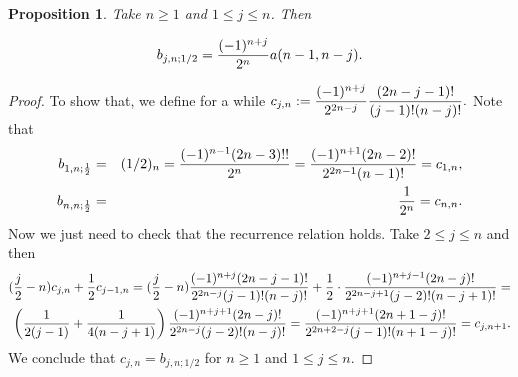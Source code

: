 \documentclass[a4paper,12pt]{amsart}
\newtheorem{proposition}[thm]{Proposition}
\theoremstyle{definition}
\theoremstyle{remark}
\begin{document}
\begin{proposition}\label{parti} Take  $n\ge 1$ and $1\le j\le n$. Then

$$
b_{j,n;1/2}={(-1)^{n+j}\over2^{n}}a(n-1,n-j).
$$

\end{proposition}
\begin{proof}

To show that, we define for a while $ \displaystyle{c_{j,n}:={(-1)^{n+j}\over2^{2n-j}}{(2n-j-1)!\over (j-1)!(n-j)!}.}$ Note that
\begin{eqnarray*}
b_{1,n;\frac{1}{2}}&=&(1/2)_n=\frac{(-1)^{n-1}(2n-3)!!}{2^n}=\frac{(-1)^{n+1}(2n-2)!}{2^{2n-1}(n-1)!}=c_{1,n},\cr
b_{n,n;\frac{1}{2}}&=&\frac{1}{2^n}=c_{n,n}.\end{eqnarray*}
Now we just need to check that the recurrence relation holds. Take $2\le j\le n$ and then
\begin{align*}
({j\over 2} -n)c_{j,n}+{1\over 2}c_{j-1,n}=(\frac{j}{2}-n)\frac{(-1)^{n+j}(2n-j-1)!}{2^{2n-j}(j-1)!(n-j)!}+\frac{1}{2}\cdot \frac{(-1)^{n+j-1}(2n-j)!}{2^{2n-j+1}(j-2)!(n-j+1)!}=\\
\left(\frac{1}{2(j-1)}+\frac{1}{4(n-j+1)}\right)\frac{(-1)^{n+j+1}(2n-j)!}{2^{2n-j}(j-2)!(n-j)!}=\frac{(-1)^{n+j+1}(2n+1-j)!}{2^{2n+2-j}(j-1)!(n+1-j)!}=c_{j,n+1}.
\end{align*}
We conclude that $c_{j,n}= b_{j,n;1/2}$ for $n\ge 1$ and $1\le j\le n$.
\end{proof}
\end{document}
